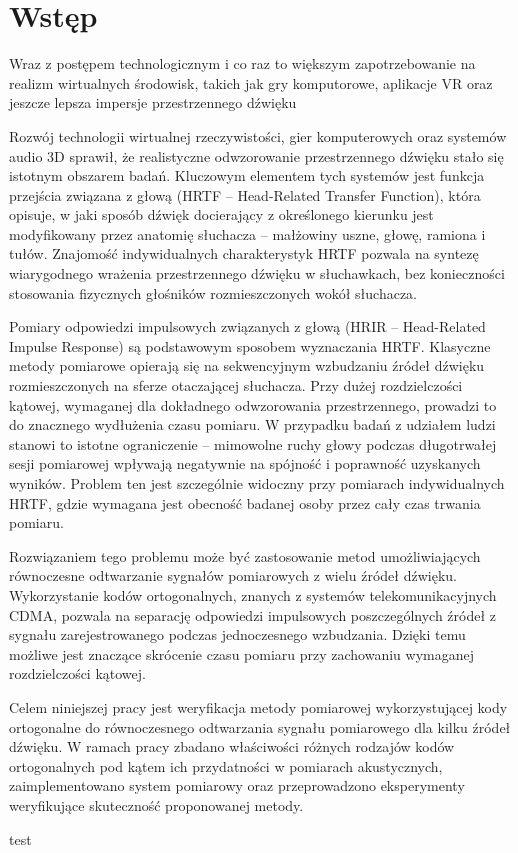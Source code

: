 \newpage
\section{Wstęp}
Wraz z postępem technologicznym i co raz to większym zapotrzebowanie na realizm wirtualnych środowisk, takich jak gry komputorowe, aplikacje VR oraz jeszcze lepsza impersje przestrzennego dźwięku

Rozwój technologii wirtualnej rzeczywistości, gier komputerowych oraz systemów audio 3D sprawił, że realistyczne odwzorowanie przestrzennego dźwięku stało się istotnym obszarem badań. Kluczowym elementem tych systemów jest funkcja przejścia związana z głową (HRTF -- Head-Related Transfer Function), która opisuje, w jaki sposób dźwięk docierający z określonego kierunku jest modyfikowany przez anatomię słuchacza -- małżowiny uszne, głowę, ramiona i tułów. Znajomość indywidualnych charakterystyk HRTF pozwala na syntezę wiarygodnego wrażenia przestrzennego dźwięku w słuchawkach, bez konieczności stosowania fizycznych głośników rozmieszczonych wokół słuchacza.

Pomiary odpowiedzi impulsowych związanych z głową (HRIR -- Head-Related Impulse Response) są podstawowym sposobem wyznaczania HRTF. Klasyczne metody pomiarowe opierają się na sekwencyjnym wzbudzaniu źródeł dźwięku rozmieszczonych na sferze otaczającej słuchacza. Przy dużej rozdzielczości kątowej, wymaganej dla dokładnego odwzorowania przestrzennego, prowadzi to do znacznego wydłużenia czasu pomiaru. W przypadku badań z udziałem ludzi stanowi to istotne ograniczenie -- mimowolne ruchy głowy podczas długotrwałej sesji pomiarowej wpływają negatywnie na spójność i poprawność uzyskanych wyników. Problem ten jest szczególnie widoczny przy pomiarach indywidualnych HRTF, gdzie wymagana jest obecność badanej osoby przez cały czas trwania pomiaru.

Rozwiązaniem tego problemu może być zastosowanie metod umożliwiających równoczesne odtwarzanie sygnałów pomiarowych z wielu źródeł dźwięku. Wykorzystanie kodów ortogonalnych, znanych z systemów telekomunikacyjnych CDMA, pozwala na separację odpowiedzi impulsowych poszczególnych źródeł z sygnału zarejestrowanego podczas jednoczesnego wzbudzania. Dzięki temu możliwe jest znaczące skrócenie czasu pomiaru przy zachowaniu wymaganej rozdzielczości kątowej.

Celem niniejszej pracy jest weryfikacja metody pomiarowej wykorzystującej kody ortogonalne do równoczesnego odtwarzania sygnału pomiarowego dla kilku źródeł dźwięku. W ramach pracy zbadano właściwości różnych rodzajów kodów ortogonalnych pod kątem ich przydatności w pomiarach akustycznych, zaimplementowano system pomiarowy oraz przeprowadzono eksperymenty weryfikujące skuteczność proponowanej metody.

test